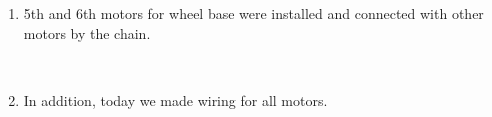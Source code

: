 \begin{enumerate}
\begin{enumerate}
        \item 5th and 6th motors for wheel base were installed and connected with other motors by the chain.
        \begin{figure}[H]
        	\begin{minipage}[h]{0.2\linewidth}
        		\center  
        	\end{minipage}
        	\begin{minipage}[h]{0.6\linewidth}
        		\caption{}
        	\end{minipage}
        \end{figure}
        
        \item In addition, today we made wiring for all motors.
        \begin{figure}[H]
        	\begin{minipage}[h]{0.2\linewidth}
        		\center  
        	\end{minipage}
        	\begin{minipage}[h]{0.6\linewidth}
        		\caption{}
        	\end{minipage}
        \end{figure}


\end{enumerate}
\end{enumerate}
